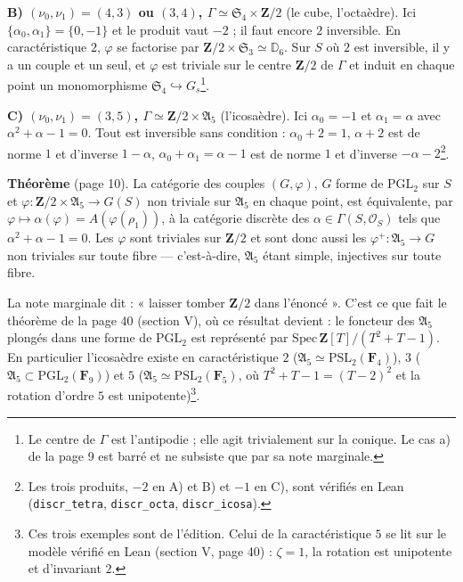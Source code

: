 \documentclass[11pt,a4paper]{article}
\begin{document}
\textbf{B) $(\nu_0, \nu_1) = (4, 3)$ ou $(3, 4)$, $\Gamma \simeq \mathfrak{S}_4
\times \mathbf{Z}/2$} (le cube, l'octaèdre). Ici $\{\alpha_0, \alpha_1\} =
\{0, -1\}$ et le produit vaut $-2$ ; il faut encore $2$ inversible. En
caractéristique $2$, $\varphi$ se factorise par $\mathbf{Z}/2 \times
\mathfrak{S}_3 \simeq \mathbb{D}_6$. Sur $S$ où $2$ est inversible, il y a
un couple et un seul, et $\varphi$ est triviale sur le centre $\mathbf{Z}/2$
de $\Gamma$ et induit en chaque point un monomorphisme $\mathfrak{S}_4
\hookrightarrow G_s$\footnote{Le centre de $\Gamma$ est l'antipodie ; elle
agit trivialement sur la conique. Le cas a) de la page 9 est barré et ne
subsiste que par sa note marginale.}.

\textbf{C) $(\nu_0, \nu_1) = (3, 5)$, $\Gamma \simeq \mathbf{Z}/2 \times
\mathfrak{A}_5$} (l'icosaèdre). Ici $\alpha_0 = -1$ et $\alpha_1 = \alpha$
avec $\alpha^2 + \alpha - 1 = 0$. Tout est inversible sans condition :
$\alpha_0 + 2 = 1$, $\alpha + 2$ est de norme $1$ et d'inverse $1 - \alpha$,
$\alpha_0 + \alpha_1 = \alpha - 1$ est de norme $1$ et d'inverse $-\alpha -
2$\footnote{Les trois produits, $-2$ en A) et B) et $-1$ en C), sont
vérifiés en Lean (\texttt{discr\_tetra}, \texttt{discr\_octa},
\texttt{discr\_icosa}).}.

\textbf{Théorème} (page 10). La catégorie des couples $(G, \varphi)$, $G$ forme
de $\mathrm{PGL}_2$ sur $S$ et $\varphi : \mathbf{Z}/2 \times \mathfrak{A}_5
\to G(S)$ non triviale sur $\mathfrak{A}_5$ en chaque point, est équivalente,
par $\varphi \mapsto \alpha(\varphi) = A(\varphi(\rho_1))$, à la catégorie
discrète des $\alpha \in \Gamma(S, \mathcal{O}_S)$ tels que $\alpha^2 + \alpha
- 1 = 0$. Les $\varphi$ sont triviales sur $\mathbf{Z}/2$ et sont donc aussi
les $\varphi^+ : \mathfrak{A}_5 \to G$ non triviales sur toute fibre ---
c'est-à-dire, $\mathfrak{A}_5$ étant simple, injectives sur toute fibre.

La note marginale dit : « laisser tomber $\mathbf{Z}/2$ dans l'énoncé ». C'est
ce que fait le théorème de la page 40 (section V), où ce résultat devient :
le foncteur des $\mathfrak{A}_5$ plongés dans une forme de $\mathrm{PGL}_2$
est représenté par $\mathrm{Spec}\,\mathbf{Z}[T]/(T^2 + T - 1)$. En
particulier l'icosaèdre existe en caractéristique $2$ ($\mathfrak{A}_5 \simeq
\mathrm{PSL}_2(\mathbf{F}_4)$), $3$ ($\mathfrak{A}_5 \subset
\mathrm{PGL}_2(\mathbf{F}_9)$) et $5$ ($\mathfrak{A}_5 \simeq
\mathrm{PSL}_2(\mathbf{F}_5)$, où $T^2 + T - 1 = (T - 2)^2$ et la rotation
d'ordre $5$ est unipotente)\footnote{Ces trois exemples sont de l'édition.
Celui de la caractéristique $5$ se lit sur le modèle vérifié en Lean
(section V, page 40) : $\zeta = 1$, la rotation est unipotente et
d'invariant $2$.}.
\end{document}
